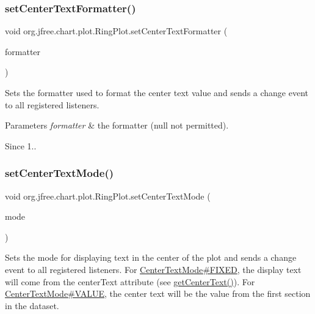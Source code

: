 \subsubsection{\texorpdfstring{set\+Center\+Text\+Formatter()}{setCenterTextFormatter()}}
{\footnotesize\ttfamily void org.\+jfree.\+chart.\+plot.\+Ring\+Plot.\+set\+Center\+Text\+Formatter (\begin{DoxyParamCaption}\item[{Format}]{formatter }\end{DoxyParamCaption})}

Sets the formatter used to format the center text value and sends a change event to all registered listeners.


\begin{DoxyParams}{Parameters}
{\em formatter} & the formatter ({\ttfamily null} not permitted).\\
\hline
\end{DoxyParams}
\begin{DoxySince}{Since}
1.. 
\end{DoxySince}
\mbox{\label{classorg_1_1jfree_1_1chart_1_1plot_1_1_ring_plot_a3e125a3e05da993d6ecf4fdf6c7d0d77}} 
\subsubsection{\texorpdfstring{set\+Center\+Text\+Mode()}{setCenterTextMode()}}
{\footnotesize\ttfamily void org.\+jfree.\+chart.\+plot.\+Ring\+Plot.\+set\+Center\+Text\+Mode (\begin{DoxyParamCaption}\item[{\mbox{\hyperlink{enumorg_1_1jfree_1_1chart_1_1plot_1_1_center_text_mode}{Center\+Text\+Mode}}}]{mode }\end{DoxyParamCaption})}

Sets the mode for displaying text in the center of the plot and sends a change event to all registered listeners. For \mbox{\hyperlink{enumorg_1_1jfree_1_1chart_1_1plot_1_1_center_text_mode_a28a61a12d960a2ebea64f911c59177cc}{Center\+Text\+Mode\#\+F\+I\+X\+ED}}, the display text will come from the {\ttfamily center\+Text} attribute (see \mbox{\hyperlink{classorg_1_1jfree_1_1chart_1_1plot_1_1_ring_plot_ab01c313db9cb63e341853cc0260fd397}{get\+Center\+Text()}}). For \mbox{\hyperlink{enumorg_1_1jfree_1_1chart_1_1plot_1_1_center_text_mode_a4d0a1a2e333a9542cf2a18a0444abe0d}{Center\+Text\+Mode\#\+V\+A\+L\+UE}}, the center text will be the value from the first section in the dataset.


